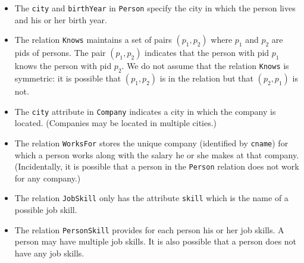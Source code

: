 \begin{itemize}
\item The {\tt city} and {\tt birthYear} in {\tt Person}
specify the city in which the person lives and his or her birth year.

\item The relation {\tt Knows} maintains a set of pairs $(p_1,p_2)$ where $p_1$ 
and $p_2$ are pids of persons.   The pair $(p_1,p_2)$ indicates that the person with
pid $p_1$ knows the person with pid $p_2$.
We do not assume that the relation {\tt Knows} is
symmetric: it is possible that $(p_1,p_2)$ is in the relation but that
$(p_2,p_1)$ is not.

\item The {\tt city} attribute in
{\tt Company} indicates a city in which the company is located.
(Companies may be located in multiple cities.)

\item The relation {\tt WorksFor} stores the unique company (identified by {\tt cname}) for which a person
works along with the salary he or she makes at that company.
(Incidentally, it is possible that a person in the {\tt Person} relation does not
work for any company.)

\item The relation {\tt JobSkill} only has the attribute {\tt skill} which is the name of a possible
job skill.    

\item The relation {\tt PersonSkill} provides for each person his or her job skills.
A person may have multiple job skills.   It is also possible that a person does not
have any job skills.
\end{itemize}


